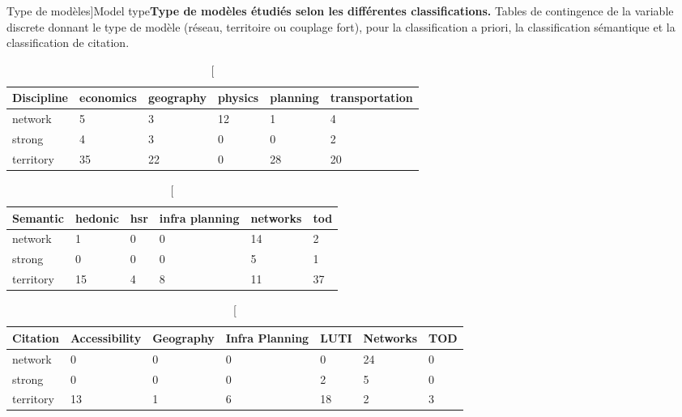 \begin{table}
\caption[Model type][Type de modèles]{Model type}{\textbf{Type de modèles étudiés selon les différentes classifications.} Tables de contingence de la variable discrete donnant le type de modèle (réseau, territoire ou couplage fort), pour la classification a priori, la classification sémantique et la classification de citation.}
\label{tab:modelography:what}
\begin{tabular}{|m{2cm}|m{2cm}m{2cm}m{2cm}m{2cm}m{2cm}|}
\hline
Discipline  &  economics & geography & physics & planning & transportation\\\hline
network     &     5      &      3    &   12    &    1     &         4  \\
strong      &     4      &     3     &   0     &   0      &        2  \\
territory   &    35      &    22     &   0     &    28    &         20 \\\hline  
\end{tabular} 
\medskip
\begin{tabular}{|m{2cm}|m{2cm}m{2cm}m{2cm}m{2cm}m{2cm}|}
\hline
Semantic  &  hedonic & hsr & infra planning & networks & tod\\\hline
network   &       1  & 0   &          0     &  14      & 2 \\
strong    &       0  &  0  &            0   &     5    & 1  \\
territory &      15  &  4  &            8   &    11    &  37 \\ \hline
\end{tabular}
\begin{tabular}{|m{2cm}|m{2cm}m{2cm}m{2cm}m{2cm}m{2cm}m{2cm}|}
\hline
Citation  &  Accessibility & Geography & Infra Planning & LUTI & Networks & TOD \\\hline
network   &            0   &     0     &         0      &   0  &     24   &  0 \\
strong    &            0   &      0    &          0     &   2  &      5   &  0 \\
territory &           13   &      1    &          6     &  18  &      2   &  3 \\\hline
\end{tabular}
\end{table}



